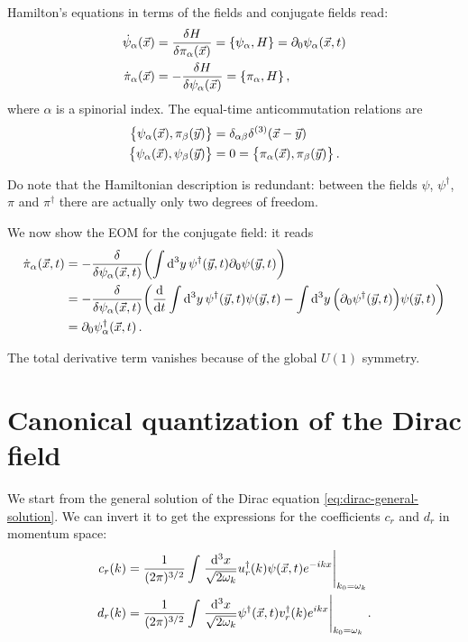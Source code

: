 \documentclass[main.tex]{subfiles}
\begin{document}
Hamilton's equations in terms of the fields and conjugate fields read: 
%
\begin{align}
\dot{\psi}_{\alpha } (\vec{x}) &= \fdv{H}{\pi_{\alpha }(\vec{x})} = \qty{\psi_{\alpha }, H} = \partial_0 \psi_{\alpha } (\vec{x}, t)\\
\dot{\pi }_{\alpha } (\vec{x}) &= - \fdv{H}{\psi _{\alpha }(\vec{x})} = \qty{\pi_{\alpha }, H} 
\,,
\end{align}
%
where \(\alpha \) is a spinorial index. 
The equal-time anticommutation relations are 
%
\begin{align}
\qty{\psi_{\alpha } (\vec{x}), \pi_{\beta } (\vec{y})} &= \delta_{\alpha \beta } \delta^{(3)} (\vec{x}-\vec{y})  \\
\qty{\psi_{\alpha }(\vec{x}), \psi_{\beta }(\vec{y})} 
&= 0 = 
\qty{\pi_{\alpha }(\vec{x}), \pi_{\beta }(\vec{y})} 
\,.
\end{align}

Do note that the Hamiltonian description is redundant: between the fields \(\psi \), \(\psi ^\dag\), \(\pi \) and \(\pi ^\dag\) there are actually only two degrees of freedom. 

We now show the EOM for the conjugate field: it reads 
%
\begin{align}
\dot{\pi}_{\alpha } (\vec{x}, t)
&= - \fdv{}{\psi_{\alpha }(\vec{x}, t)}
\qty(\int \dd[3]{y} \psi ^\dag(\vec{y}, t) \partial_0 \psi (\vec{y}, t))  \\
&= - \fdv{}{\psi_{\alpha }(\vec{x}, t)}
\qty(\dv{}{t} \int \dd[3]{y} \psi ^\dag(\vec{y}, t) \psi (\vec{y}, t)
- \int \dd[3]{y} \qty(\partial_0 \psi ^\dag (\vec{y},t) ) \psi (\vec{y}, t)
)  \\
&= \partial_0 \psi ^\dag_{\alpha } (\vec{x}, t)
\,.
\end{align}

The total derivative term vanishes because of the global \(U(1)\) symmetry. 

\section{Canonical quantization of the Dirac field}

We start from the general solution of the Dirac equation \eqref{eq:dirac-general-solution}. We can invert it to get the expressions for the coefficients \(c_r\) and \(d_r\) in momentum space: 
%
\begin{align}
c_r (k) &= \frac{1}{(2\pi )^{3/2}} \int \eval{\frac{ \dd[3]{x}}{\sqrt{2 \omega_{k}}} 
u_{r} ^\dag (k) \psi (\vec{x}, t) e^{-ikx}}_{k_0 = \omega_{k}}  \\
d_r (k) &= \frac{1}{(2\pi )^{3/2}} \int \eval{\frac{ \dd[3]{x}}{\sqrt{2 \omega_{k}}} 
\psi ^\dag (\vec{x}, t) v_{r} ^\dag (k)  e^{ikx}}_{k_0 = \omega_{k}}
\,.
\end{align}


\end{document}

